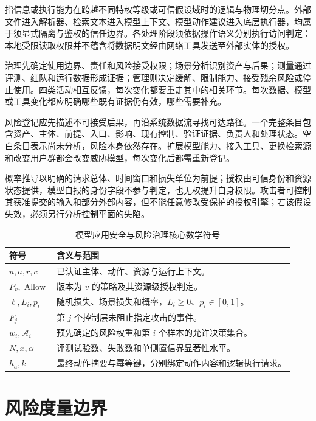 \documentclass[../textbook.tex]{subfiles}
\begin{document}
指信息或执行能力在跨越不同特权等级或可信假设域时的逻辑与物理切分点。外部文件进入解析器、检索文本进入模型上下文、模型动作建议进入底层执行器，均属于须显式隔离与鉴权的信任边界。各处理阶段须依据操作语义分别执行访问判定：本地受限读取权限并不蕴含将数据明文经由网络工具发送至外部实体的授权。

治理先确定使用边界、责任和风险接受权限；场景分析识别资产与后果；测量通过评测、红队和运行数据形成证据；管理则决定缓解、限制能力、接受残余风险或停止使用。四类活动相互反馈，每次变化都要重走其中的相关环节。每次数据、模型或工具变化都应明确哪些既有证据仍有效，哪些需要补充。

风险登记应先描述不可接受后果，再沿系统数据流寻找可达路径。一个完整条目包含资产、主体、前提、入口、影响、现有控制、验证证据、负责人和处理状态。空白条目表示尚未分析，风险本身依然存在。扩展模型能力、接入工具、更换检索源和改变用户群都会改变威胁模型，每次变化后都需重新登记。

\begin{assumption}[本章风险与授权模型的前提]
概率推导以明确的请求总体、时间窗口和损失单位为前提；授权由可信身份和资源状态提供，模型自报的身份字段不参与判定，也无权提升自身权限。攻击者可控制其获准提交的输入和部分外部内容，但不能任意修改受保护的授权引擎；若该假设失效，必须另行分析控制平面的失陷。
\end{assumption}

\begin{table}[htbp]
\centering
\caption{模型应用安全与风险治理核心数学符号}\label{tab:security-notations}
\begin{tabularx}{\linewidth}{p{24mm}X}
\toprule 符号 & 含义与范围\\\midrule
$u,a,r,c$ & 已认证主体、动作、资源与运行上下文。\\
$P_v,\operatorname{Allow}$ & 版本为 $v$ 的策略及其资源级授权判定。\\
$\ell,L_i,p_i$ & 随机损失、场景损失和概率，$L_i\ge0$、$p_i\in[0,1]$。\\
$F_j$ & 第 $j$ 个控制层未阻止指定攻击的事件。\\
$w_i,\mathcal A_i$ & 预先确定的风险权重和第 $i$ 个样本的允许决策集合。\\
$N,x,\alpha$ & 评测试验数、失败数和单侧置信界显著性水平。\\
$h_a,k$ & 最终动作摘要与幂等键，分别绑定动作内容和逻辑执行请求。\\
\bottomrule
\end{tabularx}
\end{table}

\section{风险度量边界}
\end{document}
